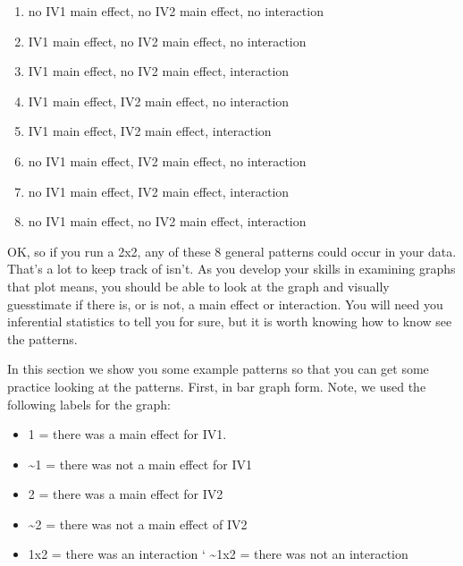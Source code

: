 \documentclass[
]{book}
\providecommand{\tightlist}{%
  \setlength{\itemsep}{0pt}\setlength{\parskip}{0pt}}
\begin{document}
\begin{enumerate}
\def\labelenumi{\arabic{enumi}.}
\tightlist
\item
  no IV1 main effect, no IV2 main effect, no interaction
\item
  IV1 main effect, no IV2 main effect, no interaction
\item
  IV1 main effect, no IV2 main effect, interaction
\item
  IV1 main effect, IV2 main effect, no interaction
\item
  IV1 main effect, IV2 main effect, interaction
\item
  no IV1 main effect, IV2 main effect, no interaction
\item
  no IV1 main effect, IV2 main effect, interaction
\item
  no IV1 main effect, no IV2 main effect, interaction
\end{enumerate}

OK, so if you run a 2x2, any of these 8 general patterns could occur in your data. That's a lot to keep track of isn't. As you develop your skills in examining graphs that plot means, you should be able to look at the graph and visually guesstimate if there is, or is not, a main effect or interaction. You will need you inferential statistics to tell you for sure, but it is worth knowing how to know see the patterns.

In this section we show you some example patterns so that you can get some practice looking at the patterns. First, in bar graph form. Note, we used the following labels for the graph:

\begin{itemize}
\tightlist
\item
  1 = there was a main effect for IV1.
\item
  \textasciitilde1 = there was not a main effect for IV1
\item
  2 = there was a main effect for IV2
\item
  \textasciitilde2 = there was not a main effect of IV2
\item
  1x2 = there was an interaction
  ` \textasciitilde1x2 = there was not an interaction
\end{itemize}
\end{document}
